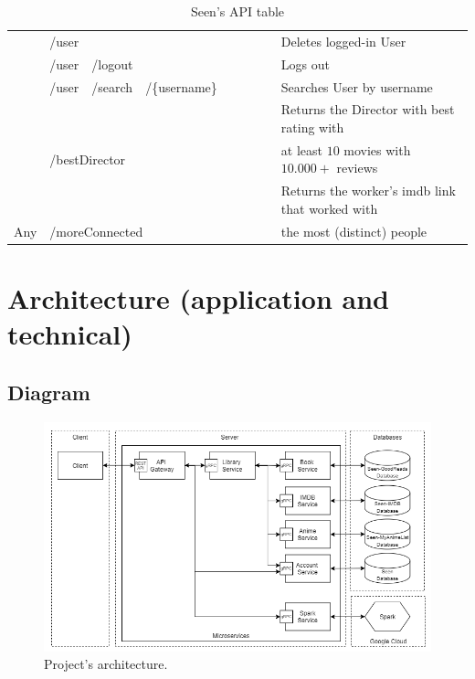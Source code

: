 \documentclass[oneside]{article}
\newcommand{\xmark}{\ding{53}} %
\begin{document}
\begin{table}[H]
\begin{adjustbox}{width=1.3\textwidth}
\begin{tabular}{ c|l l l l|c|c|c|c|l }
    & \multicolumn{4}{l|}{/user} &
     & & & \xmark &
    Deletes logged-in User
    \\ \rowcolor{Gray}
    \multirow{-2}{*}{User} 
    & /user & \multicolumn{3}{l|}{/logout} &
    \xmark & & & &
    Logs out
    \\ \hhline{-|----|-|-|-|-|~}
    & /user & /search & \multicolumn{2}{l|}{/\{username\}} &
    \xmark & & & &
    Searches User by username
    \\ 
    & \multicolumn{4}{l|}{} &
     & & & &
    Returns the Director with best rating with \\
    & \multicolumn{4}{l|}{\multirow{-2}{*}{/bestDirector}} &
    \multirow{-2}{*}{\xmark}
     & & & &
    at least $10$ movies with $10.000+$ reviews
    \\ 
    & \multicolumn{4}{l|}{} &
     & & & &
    Returns the worker's imdb link that worked with \\
    \multirow{-5}{*}{Any} 
    & \multicolumn{4}{l|}{\multirow{-2}{*}{/moreConnected}} &
    \multirow{-2}{*}{\xmark} & & & &
    the most (distinct) people
  \end{tabular}
  \end{adjustbox}
  \caption{Seen's API table}
\end{table}

\section{Architecture (application and technical)}
\label{sec:architecture}
  \subsection{Diagram}
  \begin{figure}[H]
    \centering
    \includegraphics[width=\textwidth]{ CloudNativeAppArchitecture.png }
    \caption{Project's architecture.}
    \label{img:architecture}
  \end{figure}
\end{document}
